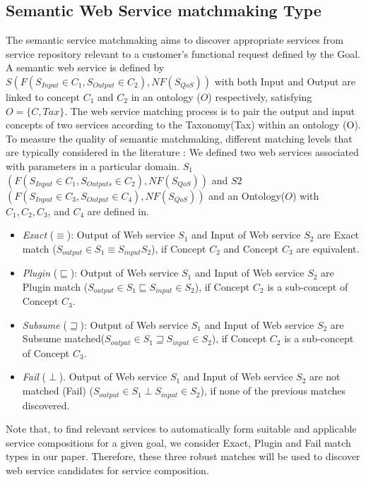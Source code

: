 \documentclass{llncs}
\begin{document}
\subsection{Semantic Web Service matchmaking Type}\label{semantic Web service Discovery}
The semantic service matchmaking aims to discover appropriate services from service repository relevant to a customer's functional request defined by the Goal. A semantic web service is defined by $S(F(S_{Input}\in C_{1}, S_{Output}\in C_{2}), NF(S_{QoS}))$ with both Input and Output are linked to concept $C_{1}$ and $C_{2}$ in an ontology ($O$) respectively, satisfying $O=\{C, Tax\}$. The web service matching process is to pair the output and input concepts of two services according to the Taxonomy(Tax) within an ontology (O). To measure the quality of semantic matchmaking, different matching levels that are typically considered in the literature \cite{paolucci2002semantic}: We defined two web services associated with parameters in a particular domain. $S_{1}$ $(F(S_{Input}\in C_{1}, S_{Outputs}\in C_{2}), NF(S_{QoS}))$ and  $S2$ $(F(S_{Input}\in C_{3}, S_{Output}\in C_{4}), NF(S_{QoS}))$ and an Ontology($O$) with $C_{1},C_{2},C_{3}$, and $C_{4}$ are defined in. 

\begin{itemize}
\item \textit{Exact} ($\equiv$): Output of Web service $S_{1}$ and Input of Web service $S_{2}$ are Exact match ($ S_{output} \in S_{1} \equiv S_{input}S_{2}$), if  Concept $C_{2}$ and Concept $C_{3}$ are equivalent.
\item \textit{Plugin} ($\sqsubseteq$): Output of Web service $S_{1}$ and Input of Web service $S_{2}$ are Plugin match ($S_{output} \in S_{1} \sqsubseteq S_{input} \in S_{2}$), if  Concept $C_{2}$ is a sub-concept of Concept $C_{3}$.
\item \textit{Subsume} ($\sqsupseteq$): Output of Web service $S_{1}$ and Input of Web service $S_{2}$ are Subsume matched($S_{output} \in S_{1} \sqsupseteq S_{input} \in S_{2}$), if  Concept $C_{2}$ is a sub-concept of  Concept $C_{3}$.
\item \textit{Fail} ($\perp$). Output of Web service $S_{1}$ and Input of Web service $S_{2}$ are not matched (Fail) ($S_{output} \in S_{1} \perp S_{input} \in S_{2}$), if none of the previous matches discovered.
\end{itemize}

Note that, to find relevant services to automatically form suitable and applicable service compositions for a given goal, we consider Exact, Plugin and Fail match types in our paper. Therefore, these three robust matches will be used to discover web service candidates for service composition. 
\end{document}
